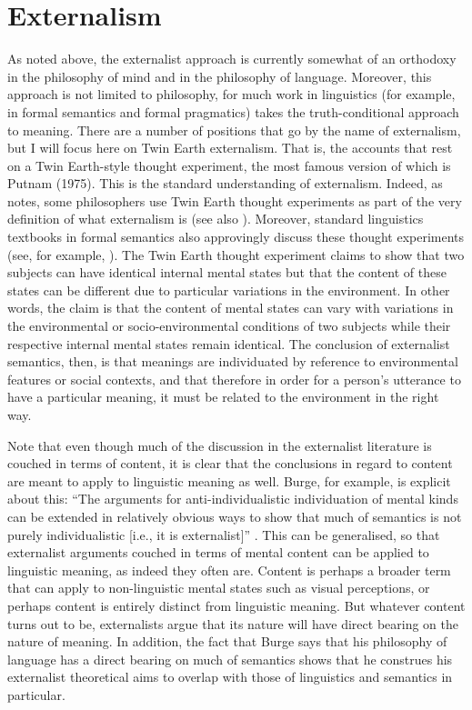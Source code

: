 \chapter{Externalism}
As noted above, the externalist approach is currently somewhat of an orthodoxy in the philosophy of mind and in the philosophy of language. Moreover, this approach is not limited to philosophy, for much work in linguistics (for example, in formal semantics and formal pragmatics) takes the truth-conditional approach to meaning. There are a number of positions that go by the name of externalism, but I will focus here on Twin Earth externalism. That is, the accounts that rest on a Twin Earth-style thought experiment, the most famous version of which is Putnam (1975). This is the standard understanding of externalism. Indeed, as \citet{Farkas2003} notes, some philosophers use Twin Earth thought experiments as part of the very definition of what externalism is (see also \citealt{McLaughlinTye1998}). Moreover, standard linguistics textbooks in formal semantics also approvingly discuss these thought experiments (see, for example, \citealt[7ff.]{Portner2005}). The Twin Earth thought experiment claims to show that two subjects can have identical internal mental states but that the content of these states can be different due to particular variations in the environment. In other words, the claim is that the content of mental states can vary with variations in the environmental or socio-environmental conditions of two subjects while their respective internal mental states remain identical. The conclusion of externalist semantics, then, is that meanings are individuated by reference to environmental features or social contexts, and that therefore in order for a person’s utterance to have a particular meaning, it must be related to the environment in the right way.

Note that even though much of the discussion in the externalist literature is couched in terms of content, it is clear that the conclusions in regard to content are meant to apply to linguistic meaning as well. Burge, for example, is explicit about this: “The arguments for anti-individualistic individuation of mental kinds can be extended in relatively obvious ways to show that much of semantics is not purely individualistic [i.e., it is externalist]” \citep[279]{Burge1989}. This can be generalised, so that externalist arguments couched in terms of mental content can be applied to linguistic meaning, as indeed they often are. Content is perhaps a broader term that can apply to non-linguistic mental states such as visual perceptions, or perhaps content is entirely distinct from linguistic meaning. But whatever content turns out to be, externalists argue that its nature will have direct bearing on the nature of meaning. In addition, the fact that Burge says that his philosophy of language has a direct bearing on much of semantics shows that he construes his externalist theoretical aims to overlap with those of linguistics and semantics in particular.


